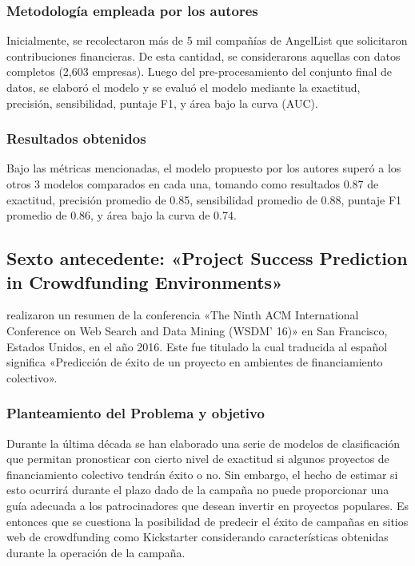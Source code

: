 \subsubsection{Metodología empleada por los autores}
Inicialmente, se recolectaron más de 5 mil compañías de AngelList que solicitaron contribuciones financieras. De esta cantidad, se considerarons aquellas con datos completos (2,603 empresas). Luego del pre-procesamiento del conjunto final de datos, se elaboró el modelo y se evaluó el modelo mediante la exactitud, precisión, sensibilidad, puntaje F1, y área bajo la curva (AUC).

\subsubsection{Resultados obtenidos}
Bajo las métricas mencionadas, el modelo propuesto por los autores superó a los otros 3 modelos comparados en cada una, tomando como resultados 0.87 de exactitud, precisión promedio de 0.85, sensibilidad promedio de 0.88, puntaje F1 promedio de 0.86, y área bajo la curva de 0.74.

\subsection{Sexto antecedente: «Project Success Prediction in Crowdfunding Environments» \citep*{pr_li2016predcrowd}}
\citeauthor{pr_li2016predcrowd} realizaron un resumen de la conferencia «The Ninth ACM International Conference on Web Search and Data Mining (WSDM’ 16)» en San Francisco, Estados Unidos, en el año 2016. Este fue titulado  la cual traducida al español significa «Predicción de éxito de un proyecto en ambientes de financiamiento colectivo».

\subsubsection{Planteamiento del Problema y objetivo}
Durante la última década se han elaborado una serie de modelos de clasificación que permitan pronosticar con cierto nivel de exactitud si algunos proyectos de financiamiento colectivo tendrán éxito o no. Sin embargo, el hecho de estimar si esto ocurrirá durante el plazo dado de la campaña no puede proporcionar una guía adecuada a los patrocinadores que desean invertir en proyectos populares. Es entonces que se cuestiona la posibilidad de predecir el éxito de campañas en sitios web de crowdfunding como Kickstarter considerando características obtenidas durante la operación de la campaña.

